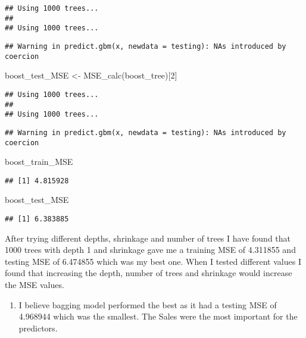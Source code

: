 \documentclass[
]{article}
\newenvironment{Shaded}{\begin{snugshade}}{\end{snugshade}}
\newcommand{\DecValTok}[1]{\textcolor[rgb]{0.00,0.00,0.81}{#1}}
\newcommand{\FunctionTok}[1]{\textcolor[rgb]{0.00,0.00,0.00}{#1}}
\newcommand{\NormalTok}[1]{#1}
\newcommand{\OtherTok}[1]{\textcolor[rgb]{0.56,0.35,0.01}{#1}}
\providecommand{\tightlist}{%
  \setlength{\itemsep}{0pt}\setlength{\parskip}{0pt}}
\begin{document}
\begin{verbatim}
## Using 1000 trees...
## 
## Using 1000 trees...
\end{verbatim}

\begin{verbatim}
## Warning in predict.gbm(x, newdata = testing): NAs introduced by coercion
\end{verbatim}

\begin{Shaded}
\begin{Highlighting}[]
\NormalTok{boost\_test\_MSE }\OtherTok{\textless{}{-}} \FunctionTok{MSE\_calc}\NormalTok{(boost\_tree)[}\DecValTok{2}\NormalTok{]}
\end{Highlighting}
\end{Shaded}

\begin{verbatim}
## Using 1000 trees...
## 
## Using 1000 trees...
\end{verbatim}

\begin{verbatim}
## Warning in predict.gbm(x, newdata = testing): NAs introduced by coercion
\end{verbatim}

\begin{Shaded}
\begin{Highlighting}[]
\NormalTok{boost\_train\_MSE}
\end{Highlighting}
\end{Shaded}

\begin{verbatim}
## [1] 4.815928
\end{verbatim}

\begin{Shaded}
\begin{Highlighting}[]
\NormalTok{boost\_test\_MSE}
\end{Highlighting}
\end{Shaded}

\begin{verbatim}
## [1] 6.383885
\end{verbatim}

After trying different depths, shrinkage and number of trees I have
found that 1000 trees with depth 1 and shrinkage gave me a training MSE
of 4.311855 and testing MSE of 6.474855 which was my best one. When I
tested different values I found that increasing the depth, number of
trees and shrinkage would increase the MSE values.

\begin{enumerate}
\def\labelenumi{\alph{enumi})}
\setcounter{enumi}{4}
\tightlist
\item
  I believe bagging model performed the best as it had a testing MSE of
  4.968944 which was the smallest. The Sales were the most important for
  the predictors.
\end{enumerate}
\end{document}
